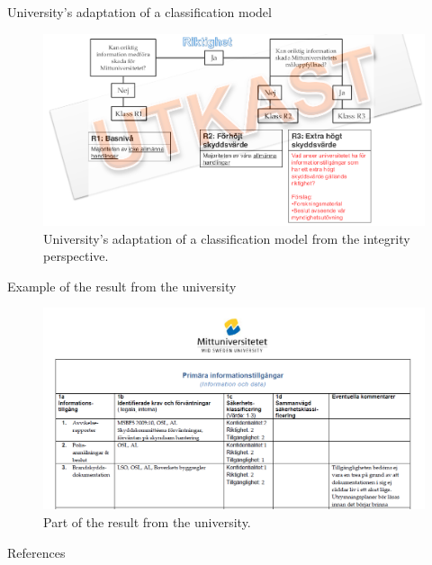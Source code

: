 \documentclass{beamer}
\begin{document}
\begin{frame}{University's adaptation of a classification model}
  \begin{figure}
    \includegraphics[width=\textwidth]{Figures/miun-riktighet.png}
    \caption{University's adaptation of a classification model from the
      integrity perspective.}
  \end{figure}
\end{frame}

\begin{frame}{Example of the result from the university}
  \begin{figure}
    \includegraphics[width=\textwidth]{Figures/miun-klassresultat.png}
    \caption{Part of the result from the university.}
  \end{figure}
\end{frame}




\begin{frame}[allowframebreaks]{References}
	\small
  \printbibliography{}
\end{frame}
\end{document}
